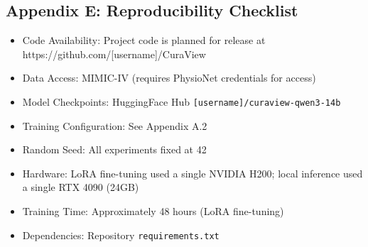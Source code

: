 \documentclass[11pt]{article}
\providecommand{\tightlist}{\setlength{\itemsep}{0pt}\setlength{\parskip}{0pt}}
\begin{document}
\subsection{Appendix E: Reproducibility Checklist}

\begin{itemize}
\tightlist
\item
  Code Availability: Project code is planned for release at https://github.com/{[}username{]}/CuraView
\item
  Data Access: MIMIC-IV (requires PhysioNet credentials for access)
\item
  Model Checkpoints: HuggingFace Hub \texttt{{[}username{]}/curaview-qwen3-14b}
\item
  Training Configuration: See Appendix A.2
\item
  Random Seed: All experiments fixed at 42
\item
  Hardware: LoRA fine-tuning used a single NVIDIA H200; local inference used a single RTX 4090 (24GB)
\item
  Training Time: Approximately 48 hours (LoRA fine-tuning)
\item
  Dependencies: Repository \texttt{requirements.txt}
\end{itemize}



\end{document}
